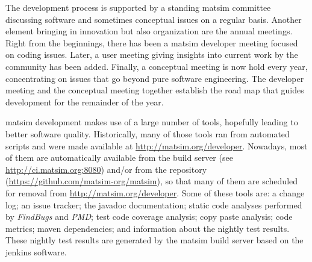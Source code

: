 The development process is supported by a standing \gls{matsim} committee discussing software and sometimes conceptual issues on a regular basis. 
Another element bringing in innovation but also organization are the annual meetings. 
Right from the beginnings, there has been a \gls{matsim} developer meeting focused on coding issues. 
Later, a user meeting giving insights into current work by the community has been added.
Finally, a conceptual meeting is now hold every year,
concentrating on issues that go beyond pure software engineering. 
The developer meeting and the conceptual meeting 
together establish the road map that guides development for the remainder of the year. 
%

%


\gls{matsim} development makes use of a 
large number of tools, hopefully leading to better software quality.  Historically, many of those tools ran from automated scripts and were made available at \url{http://matsim.org/developer}.  Nowadays, most of them are automatically available from the build server (see \url{http://ci.matsim.org:8080}) and/or from the repository (\url{https://github.com/matsim-org/matsim}), so that many of them are scheduled for removal from \url{http://matsim.org/developer}.  Some of these tools are:
%
a change log; an issue tracker; the \gls{javadoc} documentation; static code analyses performed by \emph{FindBugs} and \emph{PMD}; test code coverage analysis; copy paste analysis; code metrics; \gls{maven} dependencies; 
and information about the nightly test results. These nightly test results are generated by the \gls{matsim} build server based on the \gls{jenkins} software. 

